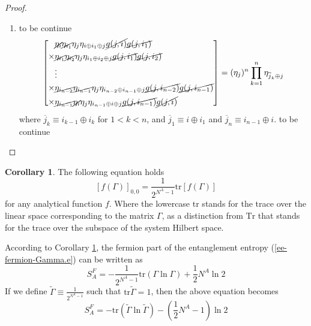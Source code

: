 \documentclass[12font]{article}
\theoremstyle{definition}
\newtheorem{corollary}{Corollary}[theorem]
\numberwithin{equation}{section}
\newcommand{\lr}[1]{\left(  #1  \right)}
\newcommand{\lrm}[1]{\left[  #1  \right]}
\newcommand{\mrm}[1]{\mathrm{#1}}
\newcommand{\alert}[1]{{\color{red}#1}}
\newcommand{\Tr}{\mrm{Tr}}
\newcommand{\tr}{\mrm{tr}}
\begin{document}
\begin{proof}
\begin{enumerate}
  \item \alert{to be continue}
    \[
    \lrm{
    \begin{aligned}
            & \cancel{\eta_i} \cancel{\eta_{i_1}} \eta_j \eta_{i\oplus i_1\oplus j} \cancel{g(j,i)} \cancel{g(j,i_1)} \\
    \times  & \cancel{\eta_{i_1}} \cancel{\eta_{i_2}} \eta_j \eta_{i_1\oplus i_2\oplus j} \cancel{g(j,i_1)} \cancel{g(j,i_2)} \\
            & \vdots \\
    \times  & \cancel{\eta_{i_{n-2}}} \cancel{\eta_{i_{n-1}}} \eta_j \eta_{i_{n-2}\oplus i_{n-1}\oplus j} \cancel{g(j,i_{n-2})} \cancel{g(j,i_{n-1})} \\
    \times  & \cancel{\eta_{i_{n-1}}} \cancel{\eta_{i}} \eta_j \eta_{i_{n-1}\oplus i\oplus j} \cancel{g(j,i_{n-1})} \cancel{g(j,i)}
    \end{aligned}
    }
    =
    (\eta_j)^n\prod_{k=1}^{n}\eta_{\overline{j}_k\oplus j}
    \]
    where $\overline{j}_k \equiv i_{k-1}\oplus i_k$ for $1<k<n$, and $\overline{j}_1 \equiv i\oplus i_1$ and $\overline{j}_n\equiv i_{n-1}\oplus i$.
    \alert{to be continue}
\end{enumerate}
\end{proof}

\begin{corollary}\label{00totr.thm}
  The following equation holds 
  \[
  [f(\Gamma)]_{0,0} = \frac{1}{2^{N^A-1}}\tr\lrm{f(\Gamma)}
  \]
  for any analytical function $f$. Where the lowercase $\tr$ stands for the trace over the linear space corresponding to the matrix $\Gamma$, as a distinction from $\Tr$ that stands for the trace over the subspace of the system Hilbert space.
\end{corollary}
According to Corollary \ref{00totr.thm}, the fermion part of the entanglement entropy (\ref{ee-fermion-Gamma.e}) can be written as
\[
    S_A^F = -\frac{1}{2^{N^A-1}}\tr\lr{\Gamma\ln\Gamma} + \frac{1}{2}N^A\ln 2
\]
If we define $\tilde{\Gamma}\equiv \frac{1}{2^{N^A-1}}$ such that $\tr\tilde{\Gamma} = 1$, then the above equation becomes
\begin{equation}\label{ee-fermion-Gamma.e}
    S_A^F = -\tr\lr{\tilde{\Gamma}\ln\tilde{\Gamma}} - \lr{\frac{1}{2}N^A -1}\ln 2
\end{equation}
\end{document}
